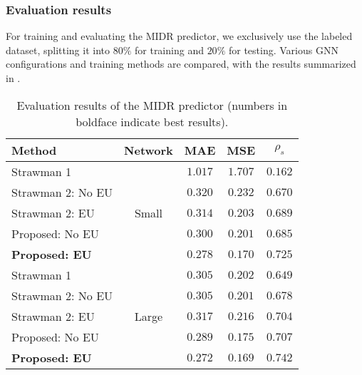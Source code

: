 \subsubsection{Evaluation results}
For training and evaluating the MIDR predictor, we exclusively use the labeled dataset, splitting it into $80\%$ for training and $20\%$ for testing. Various GNN configurations and training methods are compared, with the results summarized in .
\begin{table}[h!]
    \centering
    \caption{Evaluation results of the MIDR predictor (numbers in boldface indicate best results).}
    \begin{tabular}{lcccc}
        \toprule
        Method & Network & MAE & MSE & $\rho_s$  \\
        \midrule
        Strawman 1 & \multirow{5}{*}{Small} & $1.017$ & $1.707$ & $0.162$ \\  %
        Strawman 2: No EU &  & $0.320$ & $0.232$ & $0.670$ \\  %
        Strawman 2: EU &  & $0.314$ & $0.203$ & $0.689$ \\  %
        Proposed: No EU &  & $0.300$ & $0.201$ & $0.685$ \\  %
        \textbf{Proposed: EU} &  & $\mathbf{0.278}$ & $\mathbf{0.170}$ & $\mathbf{0.725}$ \\  %
        \midrule
        Strawman 1 & \multirow{5}{*}{Large} & $0.305$ & $0.202$ & $0.649$ \\ %
        Strawman 2: No EU &  & $0.305$ & $0.201$ & $0.678$ \\ %
        Strawman 2: EU &  & $0.317$ & $0.216$ & $0.704$ \\ %
        Proposed: No EU &  & $0.289$ & $0.175$ & $0.707$ \\ %
        \textbf{Proposed: EU} &  & $\mathbf{0.272}$ & $\mathbf{0.169}$ & $\mathbf{0.742}$ \\ %
        \bottomrule
    \end{tabular}
    \label{tab:mdrp_eval}
\end{table}

